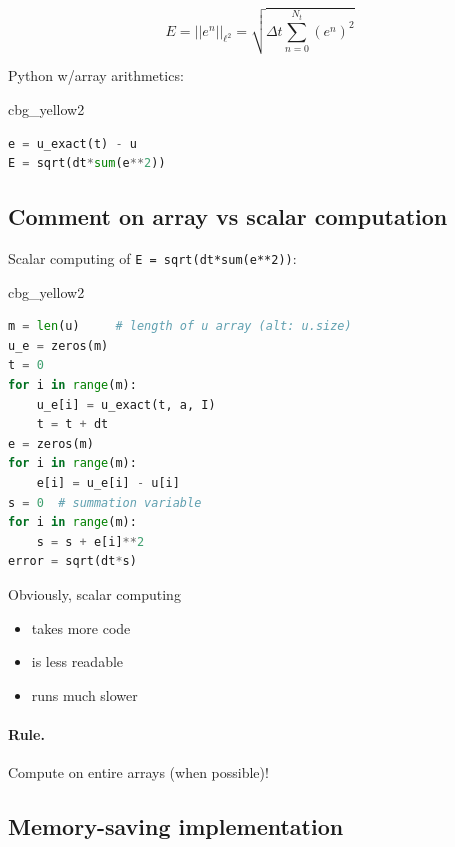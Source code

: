 \documentclass[%
oneside,                 %
final,                   %
10pt]{article}
\newenvironment{_cod_tight}[1]{
   \def\FrameCommand{\colorbox{#1}}
   \FrameRule0.6pt\MakeFramed {\FrameRestore}\vskip3mm}
   {\vskip0mm\endMakeFramed}
\newenvironment{cod}[1]{
\bgroup\rmfamily
\fboxsep=0mm\relax
\begin{_cod_tight}{#1}
\list{}{\parsep=-2mm\parskip=0mm\topsep=0pt\leftmargin=2mm
\rightmargin=2\leftmargin\leftmargin=4pt\relax}
\item\relax}
{\endlist\end{_cod_tight}\egroup}
\begin{document}
\[ E = ||e^n||_{\ell^2}  = \sqrt{\Delta t\sum_{n=0}^{N_t} (e^n)^2}\]

Python w/array arithmetics:

\begin{cod}{cbg_yellow2}\begin{lstlisting}[language=Python,style=simple,xleftmargin=2mm]
e = u_exact(t) - u
E = sqrt(dt*sum(e**2))
\end{lstlisting}\end{cod}
\noindent

\subsection*{Comment on array vs scalar computation}

Scalar computing of \texttt{E = sqrt(dt*sum(e**2))}:

\begin{cod}{cbg_yellow2}\begin{lstlisting}[language=Python,style=simple,xleftmargin=2mm]
m = len(u)     # length of u array (alt: u.size)
u_e = zeros(m)
t = 0
for i in range(m):
    u_e[i] = u_exact(t, a, I)
    t = t + dt
e = zeros(m)
for i in range(m):
    e[i] = u_e[i] - u[i]
s = 0  # summation variable
for i in range(m):
    s = s + e[i]**2
error = sqrt(dt*s)
\end{lstlisting}\end{cod}
\noindent
Obviously, scalar computing

\begin{itemize}
 \item takes more code

 \item is less readable

 \item runs much slower
\end{itemize}

\noindent

\paragraph{Rule.}
Compute on entire arrays (when possible)!




\subsection*{Memory-saving implementation}
\end{document}
